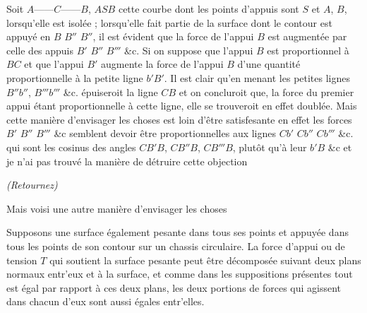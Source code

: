\documentclass[11pt,a4paper]{article}
\begin{document}
Soit $A$——$C$——$B$, $ASB$ cette courbe dont les points d'appuis sont $S$ et
$A$, $B$, lorsqu'elle est isolée ; lorsqu'elle fait partie de la surface dont
le contour est appuyé en $B$ $B''$ $B''$, il est évident que la force de
l'appui $B$ est augmentée par celle des appuis $B'$ $B''$ $B'''$ \&c. Si on
suppose que l'appui $B$ est proportionnel à $BC$ et que l'appui $B'$ augmente
la force de l'appui $B$ d'une quantité proportionnelle à la petite ligne
$b'B'$. Il est clair qu'en menant les petites lignes $B''b''$, $B'''b'''$ \&c.
 épuiseroit la ligne $CB$ et on concluroit que, la force du
premier appui étant proportionnelle à cette ligne, elle se trouveroit en
effet doublée. Mais cette manière d'envisager les choses est loin d'être
satisfesante en effet les forces $B'$ $B''$ $B'''$ \&c semblent devoir être
proportionnelles aux lignes $Cb'$ $Cb''$ $Cb'''$ \&c. qui sont les cosinus des
angles $CB'B$, $CB''B$, $CB'''B$, plutôt qu'à leur 
$b'B$ \&c et je n'ai pas trouvé la manière de détruire cette objection

\emph{(Retournez)}


Mais voisi une autre manière d'envisager les choses

Supposons une surface également pesante dans tous ses points et appuyée
dans tous les points de son contour sur un chassis circulaire. La force
d'appui ou de tension $T$ qui soutient la surface pesante peut être
décomposée suivant deux plans normaux entr'eux et à la surface, et comme
dans les suppositions présentes tout est égal par rapport à ces deux plans,
les deux portions de forces qui agissent dans chacun d'eux sont aussi égales
entr'elles.
\end{document}

